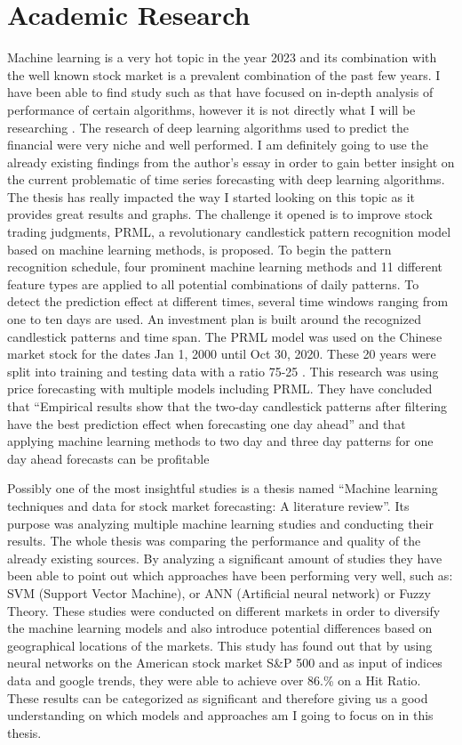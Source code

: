 \documentclass{imc-inf}
\begin{document}
	
	\section{Academic Research}
	Machine learning is a very hot topic in the year 2023 and its combination with the well known stock market is a prevalent combination
	of the past few years. I have been able to find study such as \cite{ref1}  that have focused on in-depth analysis of performance of certain algorithms,
	however it is not directly what I will be researching . The research of deep learning algorithms used to predict the financial \cite{deep_learning}
	were very niche and well performed. I am definitely going to use the already existing findings from the author's essay in order to gain better insight
	on the current problematic of time series forecasting with deep  learning algorithms. 
	The thesis \cite{prml} has really impacted the way I started looking on this topic as it provides great results and graphs.
	The challenge it opened is to improve stock trading judgments, PRML, a revolutionary candlestick pattern recognition model based on machine learning
	methods, is proposed. To begin the pattern recognition schedule, four prominent machine learning methods and 11 different feature types are applied 
	to all potential combinations of daily patterns. To detect the prediction effect at different times, several time windows ranging from one to ten days
	are used. An investment plan is built around the recognized candlestick patterns and time span.
	The PRML model was used on the Chinese market stock for the dates  Jan 1, 2000 until Oct 30, 2020. These 20 years were split into training
	and testing data with a ratio 75-25 . This research was using price forecasting with multiple models including PRML. They have concluded that 
	“Empirical results show that the two-day candlestick patterns after filtering have the best prediction effect when forecasting one day ahead”
	and that applying machine learning methods to two day and three day  patterns for one day ahead forecasts can be profitable
	
	Possibly one of the most insightful studies is a thesis named “Machine learning techniques and data for stock market forecasting: A literature review”. \cite{lit_review} 
	Its purpose was analyzing multiple machine learning studies and conducting their results. The whole thesis was comparing the performance and quality 
	of the already existing sources. By analyzing a significant amount of studies they have been able to point out which approaches have been performing
	very well, such as: SVM (Support Vector Machine), or  ANN (Artificial neural network) \cite{Deep_learning_2} or Fuzzy Theory. These studies were conducted on different markets
	in order to diversify the machine learning models and also introduce potential differences based on geographical locations of the markets.
	This study has found out that by using neural networks on the American stock market  S\&P 500  and as input of indices data and google trends,
	they were able to achieve over 86.\% on a Hit Ratio. These results can be categorized as significant and therefore giving us a good understanding 
	on which models and approaches am I going to focus on in this thesis.
	
\end{document}
